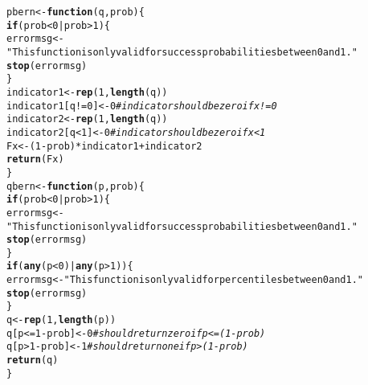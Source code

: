 \documentclass{article}\usepackage[]{graphicx}\usepackage[]{color}
\makeatletter
\newcommand{\hlnum}[1]{\textcolor[rgb]{0.686,0.059,0.569}{#1}}%
\newcommand{\hlstr}[1]{\textcolor[rgb]{0.192,0.494,0.8}{#1}}%
\newcommand{\hlcom}[1]{\textcolor[rgb]{0.678,0.584,0.686}{\textit{#1}}}%
\newcommand{\hlopt}[1]{\textcolor[rgb]{0,0,0}{#1}}%
\newcommand{\hlstd}[1]{\textcolor[rgb]{0.345,0.345,0.345}{#1}}%
\newcommand{\hlkwa}[1]{\textcolor[rgb]{0.161,0.373,0.58}{\textbf{#1}}}%
\newcommand{\hlkwb}[1]{\textcolor[rgb]{0.69,0.353,0.396}{#1}}%
\newcommand{\hlkwc}[1]{\textcolor[rgb]{0.333,0.667,0.333}{#1}}%
\newcommand{\hlkwd}[1]{\textcolor[rgb]{0.737,0.353,0.396}{\textbf{#1}}}%
\newenvironment{kframe}{%
 \def\at@end@of@kframe{}%
 \ifinner\ifhmode%
  \def\at@end@of@kframe{\end{minipage}}%
  \begin{minipage}{\columnwidth}%
 \fi\fi%
 \def\FrameCommand##1{\hskip\@totalleftmargin \hskip-\fboxsep
 \colorbox{shadecolor}{##1}\hskip-\fboxsep
     \hskip-\linewidth \hskip-\@totalleftmargin \hskip\columnwidth}%
 \MakeFramed {\advance\hsize-\width
   \@totalleftmargin\z@ \linewidth\hsize
   \@setminipage}}%
 {\par\unskip\endMakeFramed%
 \at@end@of@kframe}
\newenvironment{knitrout}{}{} %
\makeatother
\begin{document}
\begin{enumerate}
\begin{knitrout}
\begin{kframe}
\begin{alltt}
\hlstd{pbern}\hlkwb{<-}\hlkwa{function}\hlstd{(}\hlkwc{q}\hlstd{,} \hlkwc{prob}\hlstd{)\{}
  \hlkwa{if}\hlstd{(prob}\hlopt{<}\hlnum{0} \hlopt{|} \hlstd{prob}\hlopt{>}\hlnum{1}\hlstd{)\{}
    \hlstd{errormsg}\hlkwb{<-}\hlstr{"This function is only valid for success probabilities between 0 and 1."}
    \hlkwd{stop}\hlstd{(errormsg)}
  \hlstd{\}}
  \hlstd{indicator1} \hlkwb{<-} \hlkwd{rep}\hlstd{(}\hlnum{1}\hlstd{,} \hlkwd{length}\hlstd{(q))}
  \hlstd{indicator1[q} \hlopt{!=} \hlnum{0}\hlstd{]} \hlkwb{<-} \hlnum{0} \hlcom{#indicator should be zero if x!=0}
  \hlstd{indicator2} \hlkwb{<-} \hlkwd{rep}\hlstd{(}\hlnum{1}\hlstd{,} \hlkwd{length}\hlstd{(q))}
  \hlstd{indicator2[q} \hlopt{<} \hlnum{1}\hlstd{]} \hlkwb{<-} \hlnum{0} \hlcom{#indicator should be zero if x<1}
  \hlstd{Fx} \hlkwb{<-} \hlstd{(}\hlnum{1}\hlopt{-}\hlstd{prob)} \hlopt{*} \hlstd{indicator1} \hlopt{+} \hlstd{indicator2}
  \hlkwd{return}\hlstd{(Fx)}
\hlstd{\}}
\hlstd{qbern} \hlkwb{<-} \hlkwa{function}\hlstd{(}\hlkwc{p}\hlstd{,} \hlkwc{prob}\hlstd{)\{}
  \hlkwa{if}\hlstd{(prob}\hlopt{<}\hlnum{0} \hlopt{|} \hlstd{prob}\hlopt{>}\hlnum{1}\hlstd{)\{}
    \hlstd{errormsg}\hlkwb{<-}\hlstr{"This function is only valid for success probabilities between 0 and 1."}
    \hlkwd{stop}\hlstd{(errormsg)}
  \hlstd{\}}
  \hlkwa{if}\hlstd{(}\hlkwd{any}\hlstd{(p}\hlopt{<}\hlnum{0}\hlstd{)} \hlopt{|} \hlkwd{any}\hlstd{(p}\hlopt{>}\hlnum{1}\hlstd{))\{}
    \hlstd{errormsg}\hlkwb{<-}\hlstr{"This function is only valid for percentiles between 0 and 1."}
    \hlkwd{stop}\hlstd{(errormsg)}
  \hlstd{\}}
  \hlstd{q} \hlkwb{<-} \hlkwd{rep}\hlstd{(}\hlnum{1}\hlstd{,} \hlkwd{length}\hlstd{(p))}
  \hlstd{q[p} \hlopt{<=} \hlnum{1}\hlopt{-}\hlstd{prob]} \hlkwb{<-} \hlnum{0} \hlcom{# should return zero if p<=(1-prob)}
  \hlstd{q[p} \hlopt{>} \hlnum{1}\hlopt{-}\hlstd{prob]} \hlkwb{<-} \hlnum{1}  \hlcom{# should return one if p>(1-prob)}
  \hlkwd{return}\hlstd{(q)}
\hlstd{\}}


\end{alltt}
\end{kframe}
\end{knitrout}
\end{enumerate}
\end{document}
